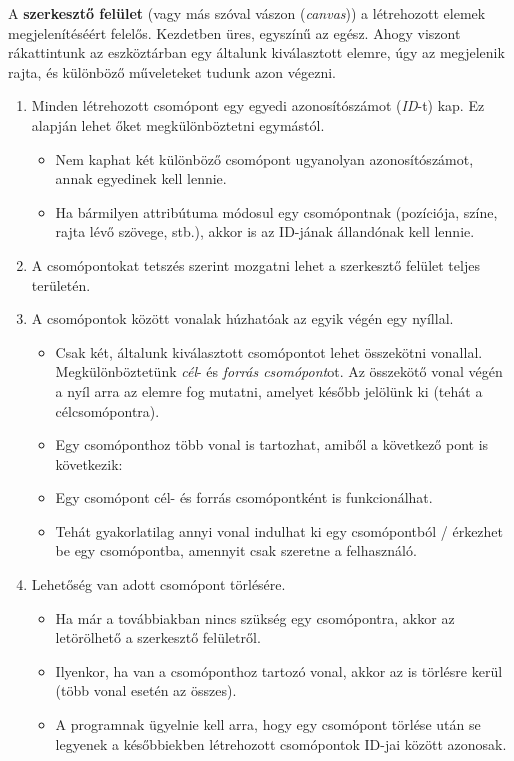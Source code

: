 A \textbf{szerkesztő felület} (vagy más szóval vászon (\textit{canvas})) a létrehozott elemek megjelenítéséért felelős. Kezdetben üres, egyszínű az egész. Ahogy viszont rákattintunk az eszköztárban egy általunk kiválasztott elemre, úgy az megjelenik rajta, és különböző műveleteket tudunk azon végezni.

\begin{enumerate}
\item Minden létrehozott csomópont egy egyedi azonosítószámot (\textit{ID}-t) kap. Ez alapján lehet őket megkülönböztetni egymástól.

\begin{itemize}
\item Nem kaphat két különböző csomópont ugyanolyan azonosítószámot, annak egyedinek kell lennie.
\item Ha bármilyen attribútuma módosul egy csomópontnak (pozíciója, színe, rajta lévő szövege, stb.), akkor is az ID-jának állandónak kell lennie.
\end{itemize}

\item A csomópontokat tetszés szerint mozgatni lehet a szerkesztő felület teljes területén.

\item A csomópontok között vonalak húzhatóak az egyik végén egy nyíllal.

\begin{itemize}
\item Csak két, általunk kiválasztott csomópontot lehet összekötni vonallal. Megkülönböztetünk \textit{cél}- és \textit{forrás csomópont}ot. Az összekötő vonal végén a nyíl arra az elemre fog mutatni, amelyet később jelölünk ki (tehát a célcsomópontra).
\item Egy csomóponthoz több vonal is tartozhat, amiből a következő pont is következik:
\item Egy csomópont cél- és forrás csomópontként is funkcionálhat.
\item Tehát gyakorlatilag annyi vonal indulhat ki egy csomópontból / érkezhet be egy csomópontba, amennyit csak szeretne a felhasználó.
\end{itemize}

\item Lehetőség van adott csomópont törlésére.

\begin{itemize}
\item Ha már a továbbiakban nincs szükség egy csomópontra, akkor az letörölhető a szerkesztő felületről.
\item Ilyenkor, ha van a csomóponthoz tartozó vonal, akkor az is törlésre kerül (több vonal esetén az összes).
\item A programnak ügyelnie kell arra, hogy egy csomópont törlése után se legyenek a későbbiekben létrehozott csomópontok ID-jai között azonosak.
\end{itemize}


\end{enumerate}

